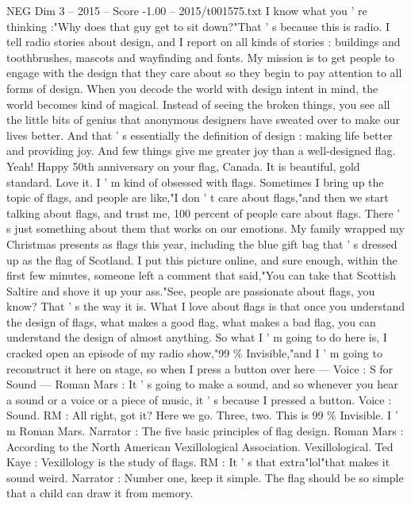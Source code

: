 \begin{textsample}{NEG Dim 3 – 2015 – Score -1.00 – 2015/t001575.txt}  \label{ex:f3_neg_051}
I know what you ' re thinking :"Why does that guy get to sit down?"That ' s because this is radio.
I tell radio stories about design, and I report on all kinds of stories : buildings and toothbrushes, mascots and wayfinding and fonts.
My mission is to get people to engage with the design that they care about so they begin to pay attention to all forms of design.
When you decode the world with design intent in mind, the world becomes kind of magical.
Instead of seeing the broken things, you see all the little bits of genius that anonymous designers have sweated over to make our lives better.
And that ' s essentially the definition of design : making life better and providing joy.
And few things give me greater joy than a well-designed flag.
Yeah!
Happy 50th anniversary on your flag, Canada.
It is beautiful, gold standard.
Love it.
I ' m kind of obsessed with flags.
Sometimes I bring up the topic of flags, and people are like,"I don ' t care about flags,"and then we start talking about flags, and trust me, 100 percent of people care about flags.
There ' s just something about them that works on our emotions.
My family wrapped my Christmas presents as flags this year, including the blue gift bag that ' s dressed up as the flag of Scotland.
I put this picture online, and sure enough, within the first few minutes, someone left a comment that said,"You can take that Scottish Saltire and shove it up your ass."See, people are passionate about flags, you know?
That ' s the way it is.
What I love about flags is that once you understand the design of flags, what makes a good flag, what makes a bad flag, you can understand the design of almost anything.
So what I ' m going to do here is, I cracked open an episode of my radio show,"99 \% Invisible,"and I ' m going to reconstruct it here on stage, so when I press a button over here — Voice : S for Sound — Roman Mars : It ' s going to make a sound, and so whenever you hear a sound or a voice or a piece of music, it ' s because I pressed a button.
Voice : Sound.
RM : All right, got it?
Here we go.
Three, two.
This is 99 \% Invisible.
I ' m Roman Mars.
Narrator : The five basic principles of flag design.
Roman Mars : According to the North American Vexillological Association.
Vexillological.
Ted Kaye : Vexillology is the study of flags.
RM : It ' s that extra"lol"that makes it sound weird.
Narrator : Number one, keep it simple.
The flag should be so simple that a child can draw it from memory.

\end{textsample}
